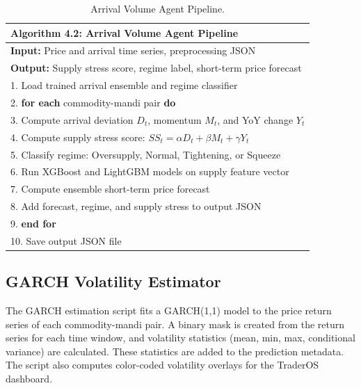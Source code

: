 \documentclass[12pt,a4paper]{report}
\theoremstyle{definition}
\theoremstyle{remark}
\begin{document}
\begin{table}[htbp]
\centering
\caption{Arrival Volume Agent Pipeline.}
\label{alg:arrival}
\begin{tabular}{p{14cm}}
\hline
\textbf{Algorithm 4.2:} Arrival Volume Agent Pipeline \\
\hline
\textbf{Input:} Price and arrival time series, preprocessing JSON \\
\textbf{Output:} Supply stress score, regime label, short-term price forecast \\
\hline
1. Load trained arrival ensemble and regime classifier \\
2. \textbf{for each} commodity-mandi pair \textbf{do} \\
3. \quad Compute arrival deviation $D_t$, momentum $M_t$, and YoY change $Y_t$ \\
4. \quad Compute supply stress score: $SS_t = \alpha D_t + \beta M_t + \gamma Y_t$ \\
5. \quad Classify regime: Oversupply, Normal, Tightening, or Squeeze \\
6. \quad Run XGBoost and LightGBM models on supply feature vector \\
7. \quad Compute ensemble short-term price forecast \\
8. \quad Add forecast, regime, and supply stress to output JSON \\
9. \textbf{end for} \\
10. Save output JSON file \\
\hline
\end{tabular}
\end{table}

\subsection{GARCH Volatility Estimator}

The GARCH estimation script fits a GARCH(1,1) model to the price return series of each commodity-mandi pair. A binary mask is created from the return series for each time window, and volatility statistics (mean, min, max, conditional variance) are calculated. These statistics are added to the prediction metadata. The script also computes color-coded volatility overlays for the TraderOS dashboard.
\end{document}
